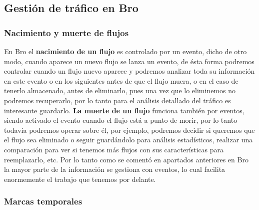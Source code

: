 \subsection{Gestión de tráfico en Bro}

\subsubsection{Nacimiento y muerte de flujos}

En Bro el \textbf{nacimiento de un flujo} es controlado por un evento, dicho de otro 
modo, cuando aparece un nuevo flujo se lanza un evento, de ésta forma podremos 
controlar cuando un flujo nuevo aparece y podremos analizar toda su información 
en este evento o en los siguientes antes de que el flujo muera, o en el caso de 
tenerlo almacenado, antes de eliminarlo, pues una vez que lo eliminemos no 
podremos recuperarlo, por lo tanto para el análisis detallado del tráfico es 
interesante guardarlo.
\intro
\textbf{La muerte de un flujo} funciona también por eventos, siendo activado el evento cuando el 
flujo está a punto de morir, por lo tanto todavía podremos operar sobre él, 
por ejemplo, podremos decidir si queremos que el flujo sea eliminado o seguir 
guardándolo para análisis estadísticos, realizar una comparación para ver si tenemos más 
flujos con sus características para reemplazarlo, etc.
\intro
Por lo tanto como se comentó en apartados anteriores en Bro la mayor parte de 
la información se gestiona con eventos, lo cual facilita enormemente el trabajo 
que tenemos por delante.

\subsubsection{Marcas temporales}

